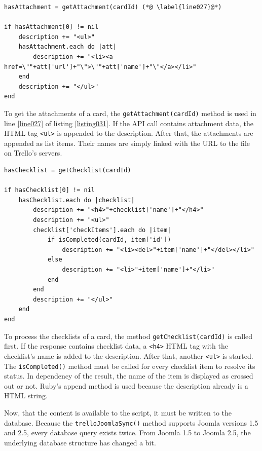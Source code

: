 \begin{lstlisting}[aboveskip=1\baselineskip, caption=Processing the attachments of a card., label=listing031]
hasAttachment = getAttachment(cardId) (*@ \label{line027}@*)

if hasAttachment[0] != nil
	description += "<ul>"		
	hasAttachment.each do |att|	
		description += "<li><a href=\""+att['url']+"\">\""+att['name']+"\"</a></li>"
	end
	description += "</ul>"
end
\end{lstlisting}

To get the attachments of a card, the \lstinline{getAttachment(cardId)} method is used in line \ref{line027} of listing \ref{listing031}. If the API call contains attachment data, the HTML tag \lstinline{<ul>} is appended to the description. After that, the attachments are appended as list items. Their names are simply linked with the URL to the file on Trello's servers. 

\begin{lstlisting}[aboveskip=1\baselineskip, caption=Processing the checklists of a card., label=listing032]
hasChecklist = getChecklist(cardId) 

if hasChecklist[0] != nil
	hasChecklist.each do |checklist| 			
		description += "<h4>"+checklist['name']+"</h4>"
		description += "<ul>"
		checklist['checkItems'].each do |item|	
			if isCompleted(cardId, item['id'])
				description += "<li><del>"+item['name']+"</del></li>"
			else
				description += "<li>"+item['name']+"</li>"
			end
		end
		description += "</ul>"
	end	
end
\end{lstlisting}

To process the checklists of a card, the method \lstinline{getChecklist(cardId)} is called first. If the response contains checklist data, a \lstinline{<h4>} HTML tag with the checklist's name is added to the description. After that, another \lstinline{<ul>} is started. The \lstinline{isCompleted()} method must be called for every checklist item to resolve its status. In dependency of the result, the name of the item is displayed as crossed out or not. Ruby's append method is used because the description already is a HTML string.

Now, that the content is available to the script, it must be written to the database. Because the \lstinline{trelloJoomlaSync()} method supports Joomla versions 1.5 and 2.5, every database query exists twice. From Joomla 1.5 to Joomla 2.5, the underlying database structure has changed a bit. 

